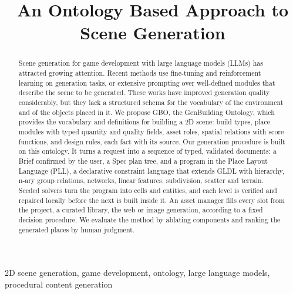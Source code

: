 \documentclass[conference]{IEEEtran}
\begin{document}
\title{An Ontology Based Approach to Scene Generation\\
}

\author{
}

\maketitle

\begin{abstract}
Scene generation for game development with large language models (LLMs) has attracted
growing attention. Recent methods use fine-tuning and reinforcement learning on
generation tasks, or extensive prompting over well-defined modules that describe the
scene to be generated. These works have improved generation quality considerably, but
they lack a structured schema for the vocabulary of the environment and of the objects
placed in it. We propose GBO, the GenBuilding Ontology, which provides the vocabulary and
definitions for building a 2D scene: build types, place modules with typed quantity and
quality fields, asset roles, spatial relations with score functions, and design rules,
each fact with its source. Our generation procedure is built on this ontology. It turns a
request into a sequence of typed, validated documents: a Brief confirmed by the user, a
Spec plan tree, and a program in the Place Layout Language (PLL), a declarative
constraint language that extends GLDL with hierarchy, n-ary group relations, networks,
linear features, subdivision, scatter and terrain. Seeded solvers turn the program into
cells and entities, and each level is verified and repaired locally before the next is
built inside it. An asset manager fills every slot from the project, a curated library,
the web or image generation, according to a fixed decision procedure. We evaluate the
method by ablating components and ranking the generated places by human judgment.
\end{abstract}

\begin{IEEEkeywords}
2D scene generation, game development, ontology, large language models, procedural content generation
\end{IEEEkeywords}
\end{document}
